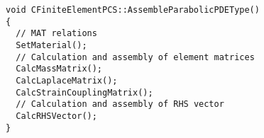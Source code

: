 \small
\begin{verbatim}
void CFiniteElementPCS::AssembleParabolicPDEType()
{
  // MAT relations
  SetMaterial();
  // Calculation and assembly of element matrices
  CalcMassMatrix();
  CalcLaplaceMatrix();
  CalcStrainCouplingMatrix();
  // Calculation and assembly of RHS vector
  CalcRHSVector();
}
\end{verbatim}
\normalfont\normalsize
